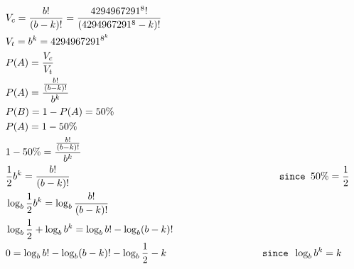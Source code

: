 \documentclass[fleqn, a4paper,12pt]{article}
\begin{document}
\[
\begin{aligned}
&V_c = \frac{b!}{(b-k)!} = \frac{4294967291^8!}{(4294967291^8-k)!} \\
&V_t = b^k = 4294967291^{8^k} \\
&P(A) = \frac{V_c}{V_t} \\
&P(A) = \frac{\frac{b!}{(b-k)!}}{b^k} \\
&P(B) = 1- P(A) = 50\%\\
&P(A) = 1 - 50\%\\
&1 - 50\% = \frac{\frac{b!}{(b-k)!}}{b^k} \\
&\frac{1}{2}b^k =  \frac{b!}{(b-k)!} \hspace{7.2cm} \texttt{ since }50\% = \frac{1}{2} \\
&\log_b\frac{1}{2}b^k = \log_b\frac{b!}{(b-k)!} \\
&\log_b\frac{1}{2} + \log_bb^k = \log_bb! - \log_b(b-k)! \\
&0 = \log_bb! - \log_b(b-k)! - \log_b\frac{1}{2} - k \hspace{3.2cm} \texttt{ since }\log_bb^k = k\\
\end{aligned}
\]
\thispagestyle{empty} %
\end{document}
